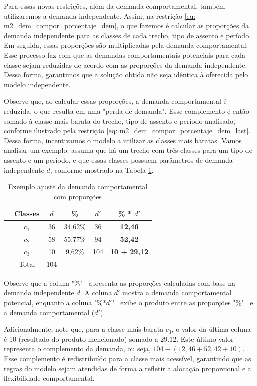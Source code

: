Para essas novas restrições, além da demanda comportamental, também utilizaremos a demanda independente. Assim, na restrição \ref{eq: m2_dem_compor_porcentaje_dem}, o que fazemos é calcular as proporções da demanda independente para as classes de cada trecho, tipo de assento e período. Em seguida, essas proporções são multiplicadas pela demanda comportamental. Esse processo faz com que as demandas comportamentais potenciais para cada classe sejam reduzidas de acordo com as proporções da demanda independente. Dessa forma, garantimos que a solução obtida não seja idêntica à oferecida pelo modelo independente.

Observe que, ao calcular essas proporções, a demanda comportamental é reduzida, o que resulta em uma "perda de demanda". Esse complemento é então somado à classe mais barata do trecho, tipo de assento e período analisado, conforme ilustrado pela restrição \ref{eq: m2_dem_compor_porcentaje_dem_last}. Dessa forma, incentivamos o modelo a utilizar as classes mais baratas. Vamos analisar um exemplo: assuma que há um trecho com três classes para um tipo de assento e um período, e que essas classes possuem parâmetros de demanda independente $d$, conforme mostrado na Tabela \ref{tab: exemplo_ajuste_demanda}.

\begin{table}[H]
	\centering
	\begin{tabular}{lccccc}
		\toprule
		 & Classes & $d$ & \%      & $d'$ & \textbf{\% * $d'$}  \\
		\midrule
		 & $c_1$   & 36  & 34,62\% & 36   & \textbf{12,46}      \\
		 & $c_2$   & 58  & 55,77\% & 94   & \textbf{52,42}      \\
		 & $c_3$   & 10  & 9,62\%  & 104  & \textbf{10 + 29,12} \\
		\midrule
		 & Total   & 104 &         &      &                     \\
		\bottomrule
	\end{tabular}
	\caption{Exemplo ajuste da demanda comportamental com proporções}
	\label{tab: exemplo_ajuste_demanda}
\end{table}

Observe que a coluna "\%" \, apresenta as proporções calculadas com base na demanda independente $d$. A coluna $d'$ mostra a demanda comportamental potencial, enquanto a coluna "\%*$d'$" \, exibe o produto entre as proporções "\%" \, e a demanda comportamental ($d'$).

Adicionalmente, note que, para a classe mais barata $c_3$, o valor da última coluna é 10 (resultado do produto mencionado) somado a $29.12$. Este último valor representa o complemento da demanda, ou seja, $104-(12,46+52,42+10)$. Esse complemento é redistribuído para a classe mais acessível, garantindo que as regras do modelo sejam atendidas de forma a refletir a alocação proporcional e a flexibilidade comportamental.

